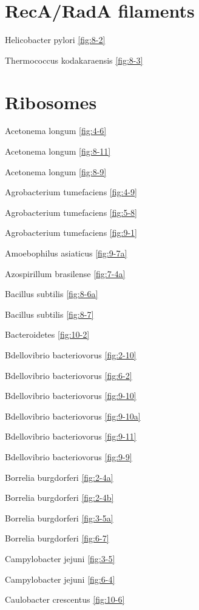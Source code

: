 \documentclass[]{tufte-book}
\begin{document}
\section*{RecA/RadA filaments}\label{recarada-filaments}

Helicobacter pylori \ref{fig:8-2}

Thermococcus kodakaraensis \ref{fig:8-3}

\section*{Ribosomes}\label{ribosomes}

Acetonema longum \ref{fig:4-6}

Acetonema longum \ref{fig:8-11}

Acetonema longum \ref{fig:8-9}

Agrobacterium tumefaciens \ref{fig:4-9}

Agrobacterium tumefaciens \ref{fig:5-8}

Agrobacterium tumefaciens \ref{fig:9-1}

Amoebophilus asiaticus \ref{fig:9-7a}

Azospirillum brasilense \ref{fig:7-4a}

Bacillus subtilis \ref{fig:8-6a}

Bacillus subtilis \ref{fig:8-7}

Bacteroidetes \ref{fig:10-2}

Bdellovibrio bacteriovorus \ref{fig:2-10}

Bdellovibrio bacteriovorus \ref{fig:6-2}

Bdellovibrio bacteriovorus \ref{fig:9-10}

Bdellovibrio bacteriovorus \ref{fig:9-10a}

Bdellovibrio bacteriovorus \ref{fig:9-11}

Bdellovibrio bacteriovorus \ref{fig:9-9}

Borrelia burgdorferi \ref{fig:2-4a}

Borrelia burgdorferi \ref{fig:2-4b}

Borrelia burgdorferi \ref{fig:3-5a}

Borrelia burgdorferi \ref{fig:6-7}

Campylobacter jejuni \ref{fig:3-5}

Campylobacter jejuni \ref{fig:6-4}

Caulobacter crescentus \ref{fig:10-6}
\end{document}
